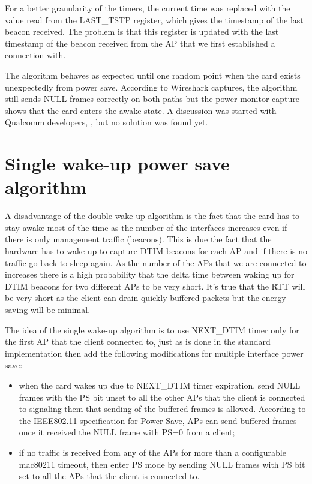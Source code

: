 For a better granularity of the timers, the current time was replaced with the value read from the LAST_TSTP register, which gives the timestamp of the last beacon received. The problem is that this register is updated with the last timestamp of the beacon received from the AP that we first established a connection with. 

The algorithm behaves as expected until one random point when the card exists unexpectedly from power save. According to Wireshark captures, the algorithm still sends NULL frames correctly on both paths but the power monitor capture shows that the card enters the awake state. A discussion was started with Qualcomm developers, \cite{cite-bugps}, but no solution was found yet.

\section{Single wake-up power save algorithm}
\label{sec:singlewakeup}

A disadvantage of the double wake-up algorithm is the fact that the card has to stay awake most of the time as the number of the interfaces increases even if there is only management traffic (beacons). This is due the fact that the hardware has to wake up to capture DTIM beacons for each AP and if there is no traffic go back to sleep again. As the number of the APs that we are connected to increases there is a high probability that the delta time between waking up for DTIM beacons for two different APs to be very short. It's true that the RTT will be very short as the client can drain quickly buffered packets but the energy saving will be minimal.

The idea of the single wake-up algorithm is to use NEXT_DTIM timer only for the first AP that the client connected to, just as is done in the standard implementation then add the following modifications for multiple interface power save: 

\begin{itemize}
\item when the card wakes up due to NEXT_DTIM timer expiration, send NULL frames with the PS bit unset to all the other APs that the client is connected to signaling them that sending of the buffered frames is allowed. According to the IEEE802.11 specification for Power Save, APs can send buffered frames once it received the NULL frame with PS=0 from a client;
\item if no traffic is received from any of the APs for more than a configurable mac80211 timeout, then enter PS mode by sending NULL frames with PS bit set to all the APs that the client is connected to. 
\end{itemize}

